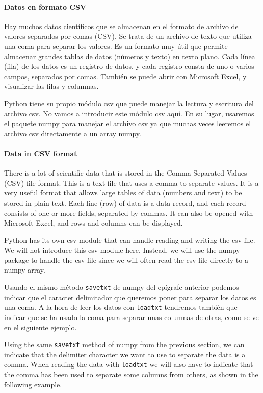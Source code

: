 \begin{paracol}{2}
\paragraph*{Datos en formato CSV}
    Hay muchos datos científicos que se almacenan en el formato de archivo de valores separados por comas (CSV). Se trata de un archivo de texto que utiliza una coma para separar los valores. Es un formato muy útil que permite almacenar grandes tablas de datos (números y texto) en texto plano. Cada línea (fila) de los datos es un registro de datos, y cada registro consta de uno o varios campos, separados por comas. También se puede abrir con Microsoft Excel, y visualizar las filas y columnas.

    Python tiene su propio módulo csv que puede manejar la lectura y escritura del archivo csv. No vamos a introducir este módulo csv aquí. En su lugar, usaremos el paquete numpy para manejar el archivo csv ya que muchas veces leeremos el archivo csv directamente a un array numpy.

\switchcolumn

\paragraph*{Data in CSV format}
    There is a lot of scientific data that is stored in the Comma Separated Values (CSV) file format. This is a text file that uses a comma to separate values. It is a very useful format that allows large tables of data (numbers and text) to be stored in plain text. Each line (row) of data is a data record, and each record consists of one or more fields, separated by commas. It can also be opened with Microsoft Excel, and rows and columns can be displayed.

    Python has its own csv module that can handle reading and writing the csv file. We will not introduce this csv module here. Instead, we will use the numpy package to handle the csv file since we will often read the csv file directly to a numpy array.

\switchcolumn

    Usando el mismo método \texttt{savetxt} de numpy del epígrafe anterior podemos indicar que el caracter delimitador que queremos poner para separar los datos es una coma. A la hora de leer los datos con \texttt{loadtxt} tendremos también que indicar que se ha usado la coma para separar unas columnas de otras, como se ve en el siguiente ejemplo.

\switchcolumn

    Using the same \texttt{savetxt} method of numpy from the previous section, we can indicate that the delimiter character we want to use to separate the data is a comma. When reading the data with \texttt{loadtxt} we will also have to indicate that the comma has been used to separate some columns from others, as shown in the following example.

\end{paracol}


